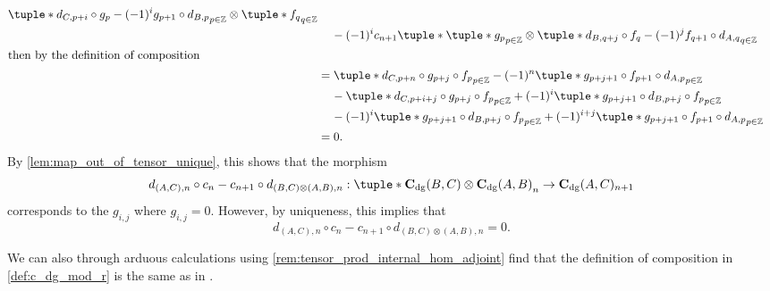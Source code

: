 \begin{remark}
\begin{enumerate}
{\begin{align*}
{                    \tuple*{
                        d_{C, p + i} \circ g_p - (-1)^i g_{p + 1} \circ d_{B, p}
                    }_{p \in \Zb} \otimes \tuple*{ f_q }_{q \in \Zb}
                } \\
                &\hspace{0.4cm} - (-1)^i c_{n + 1} \tuple*{
                    \tuple*{ g_p }_{p \in \Zb} \otimes \tuple*{
                        d_{B, q + j} \circ f_q - (-1)^j f_{q + 1} \circ d_{A, q}
                    }_{q \in \Zb}
                } \\
                \intertext{then by the definition of composition}
                &= \tuple*{
                    d_{C, p + n} \circ g_{p + j} \circ f_p
                }_{p \in \Zb} - (-1)^n \tuple*{
                    g_{p + j + 1} \circ f_{p + 1} \circ d_{A, p}
                }_{p \in \Zb} \\
                &\hspace{0.4cm} - \tuple*{
                    d_{C, p + i + j} \circ g_{p + j} \circ f_p
                }_{p \in \Zb} + (-1)^i \tuple*{
                    g_{p + j + 1} \circ d_{B, p + j} \circ f_p
                }_{p \in \Zb} \\
                &\hspace{0.4cm} - (-1)^i \tuple*{
                    g_{p + j + 1} \circ d_{B, p + j} \circ f_p
                }_{p \in \Zb} + (-1)^{i + j} \tuple*{
                    g_{p + j + 1} \circ f_{p + 1} \circ d_{A, p}
                }_{p \in \Zb} \\
                &= 0.
            \end{align*}
            By \autoref{lem:map_out_of_tensor_unique}, this shows that the morphism
            \[
                d_{(A, C), n} \circ c_n - c_{n + 1} \circ d_{(B, C) \otimes (A, B), n}: \\
                \tuple*{ \C_{\dg}(B, C) \otimes \C_{\dg}(A, B) }_n \to \C_{\dg}(A, C)_{n + 1}
            \]         
            corresponds to the \( g_{i,j} \) where \( g_{i, j} = 0 \). However, by uniqueness, this implies that
            \[
                d_{(A, C), n} \circ c_n - c_{n + 1} \circ d_{(B, C) \otimes (A, B), n} = 0.
            \]
        }
    \end{enumerate}
\end{remark}

We can also through arduous calculations using \autoref{rem:tensor_prod_internal_hom_adjoint} find that the definition of composition in \autoref{def:c_dg_mod_r} is the same as in \cite[p.\ 295]{Borceux_1994}.

